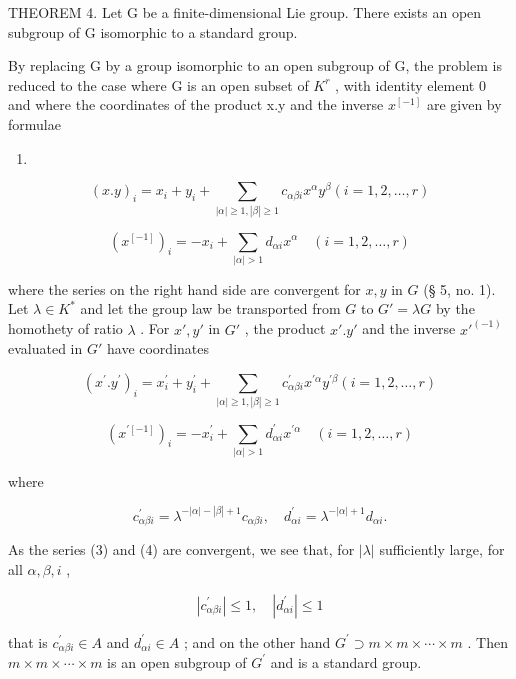 THEOREM 4. Let G be a finite-dimensional Lie group. There exists an open subgroup of G isomorphic to a standard group.

By replacing G by a group isomorphic to an open subgroup of G, the problem is reduced to the case where G is an open subset of \(K^{r}\) , with identity element 0 and where the coordinates of the product x.y and the inverse \(x^{[-1]}\) are given by formulae

\begin{enumerate}
\def\labelenumi{(\arabic{enumi})}
\setcounter{enumi}{2}
\tightlist
\item
\end{enumerate}

\[
(x. y) _ {i} = x _ {i} + y _ {i} + \sum_ {| \alpha | \geqslant 1, | \beta | \geqslant 1} c _ {\alpha \beta i} x ^ {\alpha} y ^ {\beta} (i = 1, 2, \dots , r)\tag{3}
\]

\[
(x ^ {[ - 1 ]}) _ {i} = - x _ {i} + \sum_ {| \alpha | > 1} d _ {\alpha i} x ^ {\alpha} \quad (i = 1, 2, \dots , r)\tag{4}
\]

where the series on the right hand side are convergent for \(x, y\) in \(G\) (§ 5, no. 1). Let \(\lambda \in K^*\) and let the group law be transported from \(G\) to \(G' = \lambda G\) by the homothety of ratio \(\lambda\) . For \(x', y'\) in \(G'\) , the product \(x'.y'\) and the inverse \(x'^{(-1)}\) evaluated in \(G'\) have coordinates

\[
(x ^ {\prime}. y ^ {\prime}) _ {i} = x _ {i} ^ {\prime} + y _ {i} ^ {\prime} + \sum_ {| \alpha | \geqslant 1, | \beta | \geqslant 1} c _ {\alpha \beta i} ^ {\prime} x ^ {\prime \alpha} y ^ {\prime \beta} (i = 1, 2, \dots , r)
\]

\[
(x ^ {\prime [ - 1 ]}) _ {i} = - x _ {i} ^ {\prime} + \sum_ {| \alpha | > 1} d _ {\alpha i} ^ {\prime} x ^ {\prime \alpha} \quad (i = 1, 2, \dots , r)
\]

where

\[
c _ {\alpha \beta i} ^ {\prime} = \lambda^ {- | \alpha | - | \beta | + 1} c _ {\alpha \beta i}, \quad d _ {\alpha i} ^ {\prime} = \lambda^ {- | \alpha | + 1} d _ {\alpha i}.
\]

As the series (3) and (4) are convergent, we see that, for \(|\lambda|\) sufficiently large, for all \(\alpha, \beta, i\) ,

\[
\left| c _ {\alpha \beta i} ^ {\prime} \right| \leqslant 1, \quad \left| d _ {\alpha i} ^ {\prime} \right| \leqslant 1
\]

that is \(c_{\alpha\beta i}^{\prime}\in A\) and \(d_{\alpha i}^{\prime}\in A\) ; and on the other hand \(G^{\prime}\supset m\times m\times\cdots\times m\) . Then \(m\times m\times\cdots\times m\) is an open subgroup of \(G^{\prime}\) and is a standard group.

